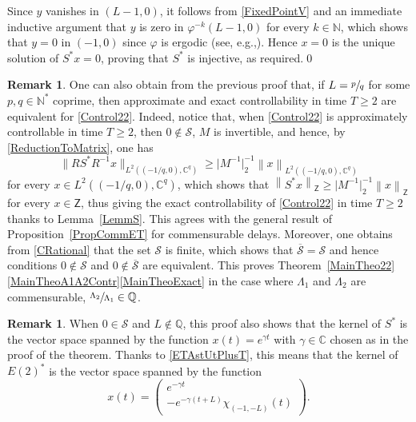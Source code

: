 \documentclass[JEP,XML,SOM,Unicode]{cedram}
\renewcommand{\eg}{e.g.,\xspace}
\theoremstyle{plain}
\theoremstyle{definition}
\newtheorem{remk}[theo]{Remark}
\newcommand{\norm}[1]{\left\lVert #1\right\lVert}
\newcommand{\nnorm}[1]{\lVert #1\lVert}
\newcommand{\nabs}[1]{\lvert #1 \rvert}
\begin{document}
Since $y$ vanishes in $(L - 1, 0)$, it follows from \eqref{FixedPointV} and an immediate inductive argument that $y$ is zero in $\varphi^{-k}(L-1, 0)$ for every $k \in \mathbb N$, which shows that $y = 0$ in $(-1, 0)$ since $\varphi$ is ergodic (see, \eg \cite[Th.\,1.5]{Walters1982Introduction}). Hence $x = 0$ is the unique solution of $S^\ast x = 0$, proving that $S^\ast$ is injective, as required.\qed

\begin{remk}
\label{RemkControlDelayRational}
One can also obtain from the previous proof that, if $L = \sfrac{p}{q}$ for some $p, q \in \mathbb N^\ast$ coprime, then approximate and exact controllability in time $T \geq 2$ are equivalent for \eqref{Control22}. Indeed, notice that, when \eqref{Control22} is approximately controllable in time $T \geq 2$, then $0 \notin \mathcal S$, $M$ is invertible, and hence, by \eqref{ReductionToMatrix}, one has
\[
\nnorm{R S^\ast R^{-1} x}_{L^2\left(\left(-{1}/{q}, 0\right), \mathbb C^q\right)} \geq \nabs{M^{-1}}_{2}^{-1} \norm{x}_{L^2\left(\left(-{1}/{q}, 0\right), \mathbb C^q\right)}
\]
for every $x \in L^2\left(\left(-{1}/{q}, 0\right), \mathbb C^q\right)$,
which shows that $\norm{S^\ast x}_{\mathsf Z} \geq \nabs{M^{-1}}_{2}^{-1} \norm{x}_{\mathsf Z}$ for \hbox{every} $x \in \mathsf Z$, thus giving the exact controllability of \eqref{Control22} in time $T \geq 2$ thanks to Lemma~\ref{LemmS}. This agrees with the general result of Proposition~\ref{PropCommET} for commensurable delays. Moreover, one obtains from \eqref{CRational} that the set $\mathcal S$ is finite, which shows that $\overline{\mathcal S} = \mathcal S$ and hence conditions $0 \notin \mathcal S$ and $0 \notin \overline{\mathcal S}$ are equivalent. This proves Theorem~\ref{MainTheo22}\eqref{MainTheoA1A2Contr}\eqref{MainTheoExact} in the case where $\Lambda_1$ and $\Lambda_2$ are commensurable, \ie $\sfrac{\Lambda_2}{\Lambda_1} \in \mathbb Q$.
\end{remk}

\begin{remk}
When $0 \in \mathcal S$ and $L \notin \mathbb Q$, this proof also shows that the kernel of $S^\ast$ is the vector space spanned by the function $x(t) = e^{\gamma t}$ with $\gamma \in \mathbb C$ chosen as in the proof of the theorem. Thanks to \eqref{ETAstUtPlusT}, this means that the kernel of $E(2)^\ast$ is the vector space spanned by the function
\[
x(t) =
\begin{pmatrix}
e^{-\gamma t} \\
-e^{-\gamma(t + L)} \chi_{(-1, -L)}(t)
\end{pmatrix}.
\]
\end{remk}
\end{document}
